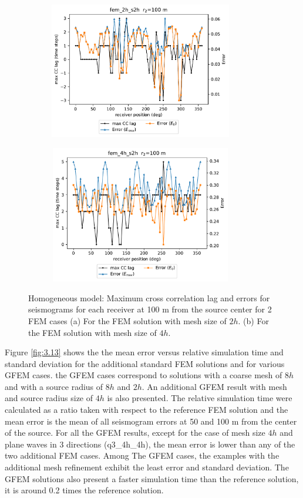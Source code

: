  \begin{figure}[h!]
 		\centering
		\begin{subfigure}{8cm}
				\includegraphics[width=8cm, height=6cm]{Thesis_Edith/figures/homo/homo_waves/Err_fem_2h_s2h_100m.pdf}
			     \caption{}
		\end{subfigure}
        \hspace{0.25cm}
		\begin{subfigure}{8cm}
				\includegraphics[width=8cm, height=6cm]{Thesis_Edith/figures/homo/homo_waves/Err_fem_4h_s2h_100m.pdf}
			   \caption{}
		\end{subfigure}
 
	\caption{Homogeneous model: Maximum cross correlation lag and errors for seismograms for each receiver at 100 m from the source center for 2 FEM cases (a) For the FEM solution with mesh size of $2h$. (b) For the FEM solution with mesh size of $4h$.}  
	\label{fig:3.12}
\end{figure}

Figure \ref{fig:3.13} shows the the mean error versus relative simulation time and standard deviation for the additional standard FEM solutions and for various GFEM cases. the  GFEM cases correspond to  solutions with a coarse mesh  of $8h$ and with a source radius of $8h$ and $2h$. An additional GFEM result with mesh and source radius size of $4h$ is also presented. The relative simulation time were calculated as a ratio taken with respect to the reference FEM solution and the mean error is the mean of all seismogram errors at 50 and 100 m from the center of the source. For all the GFEM results, except for the case of mesh size $4h$ and plane waves in 3 directions (q3\_4h\_4h), the mean error is lower than any of the two additional FEM cases. Among The GFEM cases, the examples with the additional mesh refinement exhibit the least error and standard deviation. The GFEM solutions also present a faster simulation time than the reference solution, it is around 0.2 times the reference solution. 


